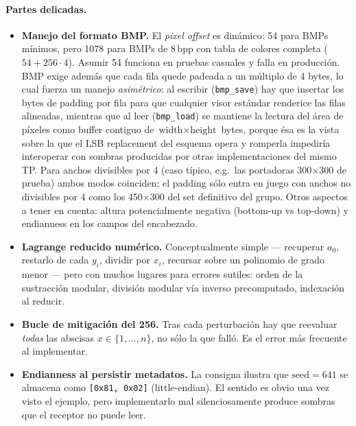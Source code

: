 \documentclass[11pt,a4paper]{article}
\begin{document}
\paragraph{Partes delicadas.}
\begin{itemize}[leftmargin=*,nosep]
    \item \textbf{Manejo del formato BMP.} El \emph{pixel offset} es
          dinámico: 54 para BMPs mínimos, pero 1078 para BMPs de 8\,bpp
          con tabla de colores completa ($54 + 256\cdot 4$). Asumir 54
          funciona en pruebas casuales y falla en producción.
          BMP exige además que cada fila quede padeada a un múltiplo de
          4 bytes, lo cual fuerza un manejo \emph{asimétrico}: al escribir
          (\texttt{bmp\_save}) hay que insertar los bytes de padding por
          fila para que cualquier visor estándar renderice las filas
          alineadas, mientras que al leer (\texttt{bmp\_load}) se mantiene
          la lectura del área de píxeles como buffer contiguo de
          $\text{width} \times \text{height}$ bytes, porque ésa es la
          vista sobre la que el LSB replacement del esquema opera y
          romperla impediría interoperar con sombras producidas por otras
          implementaciones del mismo TP. Para anchos divisibles por 4
          (caso típico, e.g.\ las portadoras 300$\times$300 de prueba)
          ambos modos coinciden; el padding sólo entra en juego con
          anchos no divisibles por 4 como los 450$\times$300 del set
          definitivo del grupo. Otros aspectos a tener en cuenta: altura
          potencialmente negativa (bottom-up vs top-down) y endianness en
          los campos del encabezado.
    \item \textbf{Lagrange reducido numérico.} Conceptualmente simple
          --- recuperar $a_0$, restarlo de cada $y_i$, dividir por $x_i$,
          recursar sobre un polinomio de grado menor --- pero con muchos
          lugares para errores sutiles: orden de la sustracción modular,
          división modular vía inverso precomputado, indexación al
          reducir.
    \item \textbf{Bucle de mitigación del 256.} Tras cada perturbación hay
          que reevaluar \emph{todas} las abscisas $x \in \{1,\dots,n\}$,
          no sólo la que falló. Es el error más frecuente al
          implementar.
    \item \textbf{Endianness al persistir metadatos.} La consigna ilustra
          que $\mathrm{seed}=641$ se almacena como \texttt{[0x81,\,0x02]}
          (little-endian). El sentido es obvio una vez visto el ejemplo,
          pero implementarlo mal silenciosamente produce sombras que el
          receptor no puede leer.
\end{itemize}
\end{document}
